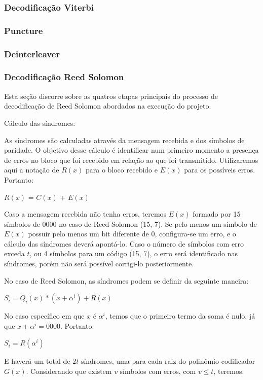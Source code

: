 	\subsubsection{Decodificação Viterbi}
	
	\subsubsection{Puncture}
	
	\subsubsection{Deinterleaver}
	
	\subsubsection{Decodificação Reed Solomon}
	
	Esta seção discorre sobre as quatros etapas principais do processo de decodificação de Reed Solomon abordados na execução do projeto.
	
	Cálculo das síndromes:
	
	As síndromes são calculadas através da mensagem recebida e dos símbolos de paridade. O objetivo desse cálculo é identificar num primeiro momento a presença de erros no bloco que foi recebido em relação ao que foi transmitido. Utilizaremos aqui a notação de $R(x)$ para o bloco recebido e $E(x)$ para os possíveis erros. Portanto:
	
	$R(x)$ = $C(x)$ + $E(x)$
	
	
	Caso a mensagem recebida não tenha erros, teremos $E(x)$ formado por 15 símbolos de 0000 no caso de Reed Solomon (15, 7). Se pelo menos um símbolo de $E(x)$ possuir pelo menos um bit diferente de 0, configura-se um erro, e o cálculo das síndromes deverá apontá-lo. Caso o número de símbolos com erro exceda $t$, ou 4 símbolos para um código (15, 7), o erro será identificado nas síndromes, porém não será possível corrigi-lo posteriormente.
	
	No caso de Reed Solomon, as síndromes podem se definir da seguinte maneira:
	
	$S_{i} = Q_{i}(x)*(x + \alpha^{i}) + R(x)$
	
	
	No caso específico em que $x$ é $\alpha^{i}$, temos que o primeiro termo da soma é nulo, já que $x + \alpha^{i} = 0000$. Portanto:
	
	$S_{i} = R(\alpha^{i})$
	
	
	E haverá um total de $2t$ síndromes, uma para cada raiz do polinômio codificador $G(x)$. Considerando que existem $v$ símbolos com erros, com $v \leq t$, teremos:
	
